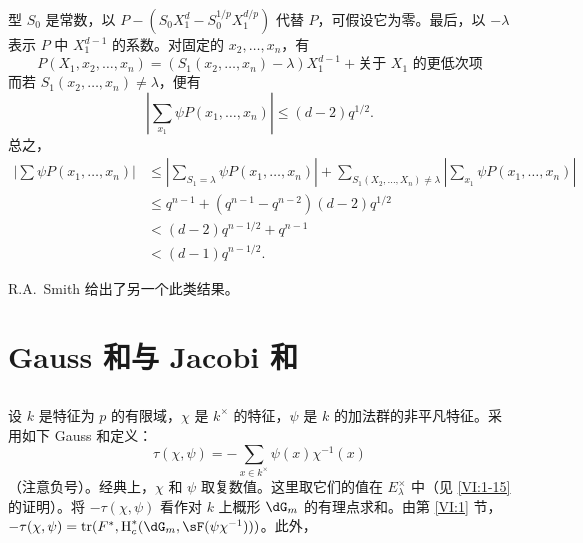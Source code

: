 型 $S_0$ 是常数，以 $P-(S_0 X_1^d -S_0^{1/p} X_1^{d/p})$ 代替 $P$，可假设它为零。最后，以 $-\lambda$ 表示 $P$ 中 $X_1^{d-1}$ 的系数。对固定的 $x_2,\dots,x_n$，有
\[
  P(X_1,x_2,\dots,x_n) = (S_1(x_2,\dots,x_n)-\lambda) X_1^{d-1} + \text{关于 $X_1$ 的更低次项}
\]
而若 $S_1(x_2,\dots,x_n)\ne \lambda$，便有
\[
  \left| \sum_{x_1} \psi P(x_1,\dots,x_n)\right| \leqslant (d-2) q^{1/2} \text{.}
\]
总之，
\begin{align*}
  \left|\sum \psi P(x_1,\dots,x_n)\right|
    &\leqslant \left|\sum_{S_1=\lambda} \psi P(x_1,\dots,x_n)\right| + \sum_{S_1(X_2,\dots,X_n)\ne\lambda} \left| \sum_{x_1} \psi P(x_1,\dots,x_n)\right| \\
    &\leqslant q^{n-1} + (q^{n-1}-q^{n-2})(d-2) q^{1/2} \\
    &< (d-2) q^{n-1/2} + q^{n-1} \\
    &< (d-1) q^{n-1/2} \text{.}
\end{align*}

R.A.\ Smith \cite{sm70} 给出了另一个此类结果。

\section{Gauss 和与 Jacobi 和}\label{VI:4}

\subsection{}\label{VI:4-1}

设 $k$ 是特征为 $p$ 的有限域，$\chi$ 是 $k^\times$ 的特征，$\psi$ 是 $k$ 的加法群的非平凡特征。采用如下 Gauss 和定义：
\begin{equation*}\tag{4.1.1}\label{VI:eq:4-1-1}
  \tau(\chi,\psi) = -\sum_{x\in k^\times} \psi(x) \chi^{-1}(x)
\end{equation*}
（注意负号）。经典上，$\chi$ 和 $\psi$ 取复数值。这里取它们的值在 $E_\lambda^\times$ 中（见 \ref{VI:1-15} 的证明）。将 $-\tau(\chi,\psi)$ 看作对 $k$ 上概形 $\dG_m$ 的有理点求和。由第 \ref{VI:1} 节，$-\tau(\chi,\psi) = \tr(F^\ast,\h_c^\ast(\dG_m,\sF(\psi \chi^{-1})))$。此外，

